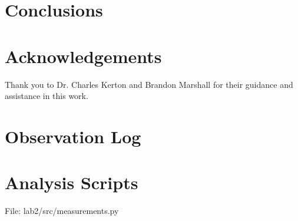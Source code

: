 \documentclass[%
aip,
jmp,
reprint,
]{revtex4-1}
\begin{document}
	
	
	\section{Conclusions}
	
	
	
	\section*{Acknowledgements}
	
	Thank you to Dr. Charles Kerton and Brandon Marshall for their guidance and assistance in this work.
	
	
	
	
	\onecolumngrid
	\appendix
	\section{Observation Log}
	
	\begin{table}[h!]
		\centering
		\label{table:log}
		
	\end{table}
	
	\section{Analysis Scripts}
	
	File: lab2/src/measurements.py
	
	
\end{document}
